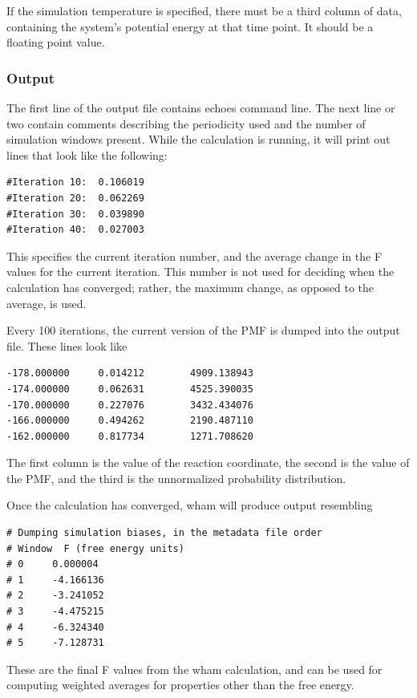 \documentclass[12pt]{article}
\begin{document}
If the simulation temperature is specified, there must be a third column of
data, containing the system's potential energy at that time point.  It
should be a floating point value.

\subsubsection{Output}

The first line of the output file contains echoes command line.  The next
line or two contain comments describing the periodicity used and the number
of simulation windows present.  
While the calculation is running, it will print out lines that look like
the following:
\begin{verbatim}
#Iteration 10:  0.106019
#Iteration 20:  0.062269
#Iteration 30:  0.039890
#Iteration 40:  0.027003
\end{verbatim}

This specifies the current iteration number, and the average change in the
F values for the current iteration.  This number is not used for deciding
when the calculation has converged; rather, the maximum change, as opposed
to the average, is used.  

Every 100 iterations, the current version of the PMF is dumped into the
output file.  These lines look like

\begin{verbatim}
-178.000000     0.014212        4909.138943
-174.000000     0.062631        4525.390035
-170.000000     0.227076        3432.434076
-166.000000     0.494262        2190.487110
-162.000000     0.817734        1271.708620
\end{verbatim}

The first column is the value of the reaction coordinate, the second is the
value of the PMF, and the third is the unnormalized probability
distribution.

Once the calculation has converged, wham will produce output resembling

\begin{verbatim}
# Dumping simulation biases, in the metadata file order 
# Window  F (free energy units)
# 0     0.000004
# 1     -4.166136
# 2     -3.241052
# 3     -4.475215
# 4     -6.324340
# 5     -7.128731
\end{verbatim}

These are the final F values from the wham calculation, and can be used for
computing weighted averages for properties other than the free energy.
\end{document}
